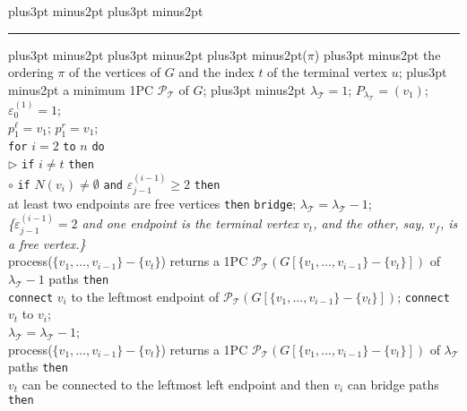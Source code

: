 \documentclass[10pt]{article}
\def\yskip{\penalty-50\vskip3pt plus3pt minus2pt}
\def\y{\yskip}
\def\yy{\yskip\yskip}
\begin{document}
\bigskip
\small{ \yy \hrule \y\y\y {}($\pi$) \y
{} the ordering $\pi$ of the vertices of $G$
and the index $t$ of the terminal vertex $u$;\y {} a minimum 1PC $\mathcal{P_{\mathcal{T}}}$ of $G$;
\y\noindent
  $\lambda_\mathcal{T}=1$;
  $P_{\lambda_\mathcal{T}}=(v_1)$; $\varepsilon^{(1)}_0=1$;\\
  $p^\ell_1=v_1$; $p^r_1=v_1$; \\
{\tt for} $i=2$ {\tt to} $n$ {\tt do}\\
$\rhd$ {\tt if} $i \neq t$ {\tt then}\\
\phantom{\tt el}$\circ$ {\tt if} $N(v_i) \neq \emptyset$ {\tt and} $\varepsilon^{(i-1)}_{j-1} \geq 2$ {\tt then}\\
\phantom{\tt el}\phantom{\tt el}\phantom{\tt el}{\tt if} at
least two endpoints are free vertices {\tt then} {\tt bridge}; $\lambda_\mathcal{T}=\lambda_\mathcal{T}-1$;\\
 \phantom{\tt
el}\phantom{\tt el}\phantom{\tt el}{\tt else}\phantom{\tt else} {\it \{$\varepsilon^{(i-1)}_{j-1}=2$ and one endpoint is the terminal vertex $v_t$, and the other, say, $v_f$, is a free vertex.\}}\\
\phantom{\tt el}\phantom{\tt el}\phantom{\tt el}\phantom{\tt
el}{\tt if} process($\{v_1, \ldots, v_{i-1}\}-\{v_t\}$) returns a
1PC $\mathcal{P_{\mathcal{T}}}(G[\{v_1, \ldots,
v_{i-1}\}-\{v_t\}])$ of $\lambda_\mathcal{T}-1$
paths {\tt then}\\
\phantom{\tt el}\phantom{\tt el}\phantom{\tt el}\phantom{\tt
el}\phantom{\tt el} {\tt connect} $v_i$ to the leftmost endpoint
of $\mathcal{P_{\mathcal{T}}}(G[\{v_1, \ldots,
v_{i-1}\}-\{v_t\}])$; {\tt connect} $v_t$ to $v_i$;\\
\phantom{\tt el}\phantom{\tt el}\phantom{\tt el}\phantom{\tt
el}\phantom{\tt el} $\lambda_\mathcal{T}=\lambda_\mathcal{T}-1$;\\
\phantom{\tt el}\phantom{\tt el}\phantom{\tt el}\phantom{\tt
el}{\tt else-if} process($\{v_1, \ldots, v_{i-1}\}-\{v_t\}$)
returns a 1PC $\mathcal{P_{\mathcal{T}}}(G[\{v_1, \ldots,
v_{i-1}\}-\{v_t\}])$ of $\lambda_\mathcal{T}$
paths {\tt then}\\
\phantom{\tt el}\phantom{\tt el}\phantom{\tt el}\phantom{\tt
el}\phantom{\tt el}{\tt if} $v_t$ can be connected to the leftmost left endpoint and then $v_i$ can bridge paths {\tt then}\\
}
\end{document}
